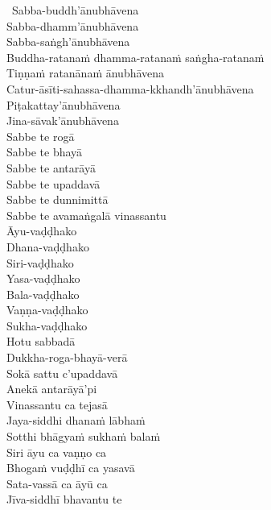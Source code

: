 \begin{pali-hang-together}
  \anglebracketleft\ \hspace{-0.5mm}Sabba-buddh'ānubhāvena \hspace{-0.5mm}\anglebracketright\ \\
  Sabba-dhamm'ānubhāvena\\
  Sabba-saṅgh'ānubhāvena\\
  Buddha-ratanaṁ dhamma-ratanaṁ saṅgha-ratanaṁ\\
  Tiṇṇaṁ ratanānaṁ ānubhāvena\\
  Catur-āsīti-sahassa-dhamma-kkhandh'ānubhāvena\\
  Piṭakattay'ānubhāvena\\
  Jina-sāvak'ānubhāvena\\
  Sabbe te rogā\\
  Sabbe te bhayā\\
  Sabbe te antarāyā\\
  Sabbe te upaddavā\\
  Sabbe te dunnimittā\\
  Sabbe te avamaṅgalā vinassantu\\
  Āyu-vaḍḍhako\\
  Dhana-vaḍḍhako\\
  Siri-vaḍḍhako\\
  Yasa-vaḍḍhako\\
  Bala-vaḍḍhako\\
  Vaṇṇa-vaḍḍhako\\
  Sukha-vaḍḍhako\\
  Hotu sabbadā\\
  Dukkha-roga-bhayā-verā\\
  Sokā sattu c'upaddavā\\
  Anekā antarāyā'pi\\
  Vinassantu ca tejasā\\
  Jaya-siddhi dhanaṁ lābhaṁ\\
  Sotthi bhāgyaṁ sukhaṁ balaṁ\\
  Siri āyu ca vaṇṇo ca\\
  Bhogaṁ vuḍḍhī ca yasavā\\
  Sata-vassā ca āyū ca\\
  Jīva-siddhī bhavantu te
\end{pali-hang-together}


